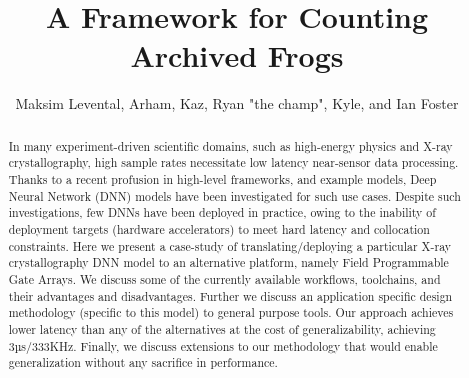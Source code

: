 \documentclass[sigconf,techreport]{acmart}
\begin{document}
\title{A Framework for Counting Archived Frogs}


\author{Maksim Levental, Arham, Kaz, Ryan "the champ", Kyle, and Ian Foster}

\renewcommand{\shortauthors}{Levental et al.}


\begin{abstract}
	In many experiment-driven scientific domains, such as high-energy physics and X-ray crystallography, high sample rates necessitate low latency near-sensor data processing.
	Thanks to a recent profusion in high-level frameworks, and example models, Deep Neural Network (DNN) models have been investigated for such use cases.
	Despite such investigations, few DNNs have been deployed in practice, owing to the inability of deployment targets (hardware accelerators) to meet hard latency and collocation constraints.
	Here we present a case-study of translating/deploying a particular X-ray crystallography DNN model to an alternative platform, namely Field Programmable Gate Arrays.
	We discuss some of the currently available workflows, toolchains, and their advantages and disadvantages.
	Further we discuss an application specific design methodology (specific to this model) to general purpose tools.
	Our approach achieves lower latency than any of the alternatives at the cost of generalizability, achieving 3µs/333KHz.
	Finally, we discuss extensions to our methodology that would enable generalization without any sacrifice in performance.
\end{abstract}



\end{document}
